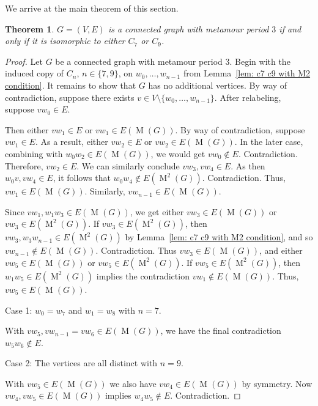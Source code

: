 \documentclass[12pt]{amsart}
\newtheorem{theorem}{Theorem}[section]
\theoremstyle{definition}
\theoremstyle{remark}
\numberwithin{equation}{section}
\numberwithin{figure}{section}
\newcommand{\M}{\operatorname{M}}
\begin{document}
We arrive at the main theorem of this section.

\begin{theorem} \label{thm: classification period 3}
    $G=(V,E)$ is a connected graph with metamour period $3$ if and only if it is isomorphic to either $C_7$ or $C_9$.
\end{theorem}

\begin{proof}
    Let $G$ be a connected graph with metamour period $3$. 
    Begin with the induced copy of $C_n$, $n\in\{7,9\}$, on $w_0,\ldots,w_{n-1}$ from Lemma~\ref{lem: c7 c9 with M2 condition}. It remains to show that $G$ has no additional vertices.
    By way of contradiction, suppose there exists $v\in V \setminus \{w_0,\dots,w_{n-1}\}$.
    After relabeling, suppose $vw_0 \in E$. 
    
    Then either $vw_1 \in E$ or $vw_1 \in E(\M(G))$. By way of contradiction, suppose $vw_1 \in E$. 
    As a result, either $v w_2 \in E$ or $v w_2 \in E(\M(G))$. In the later case, combining with $w_0 w_2 \in E(\M(G))$, we would get $v w_0 \notin E$. Contradiction. Therefore, $v w_2 \in E$.     
    We can similarly conclude $vw_3,vw_4 \in E$. As then $w_0v,vw_4 \in E$, it follows that $w_0 w_4 \notin E(\M^2(G))$. Contradiction. Thus, $vw_1 \in E(\M(G))$. Similarly, $vw_{n-1} \in E(\M(G))$.

    Since $vw_1, w_1w_3 \in E(\M(G))$, we get either $v w_3 \in E(\M(G))$ or $v w_3 \in E(\M^2(G))$.
    If $vw_3 \in E(\M^2(G))$, then $vw_3,w_3w_{n-1} \in E(\M^2(G))$ by Lemma~\ref{lem: c7 c9 with M2 condition}, and so $vw_{n-1} \notin E(\M(G))$. Contradiction. Thus $vw_3 \in E(\M(G))$, and either  $vw_5 \in E(\M(G))$ or $vw_5 \in E(\M^2(G))$. If $vw_5 \in E(\M^2(G))$, then $w_1w_5 \in E(\M^2(G))$ implies the contradiction $vw_1 \notin E(\M(G))$. Thus, $vw_5 \in E(\M(G))$.

    Case 1: $w_0 = w_7$ and $w_1 = w_8$ with $n=7$.
    
    
    With $vw_5, vw_{n-1} = vw_6 \in E(\M(G))$, we have the final contradiction $w_5w_6 \notin E$. 

    Case 2: The vertices are all distinct with $n=9$.
    
    With $vw_5 \in E(\M(G))$ we also have $vw_4 \in E(\M(G))$ by symmetry. Now $vw_4, vw_5 \in E(\M(G))$ implies $w_4w_5 \notin E$. Contradiction.
\end{proof}
\end{document}

